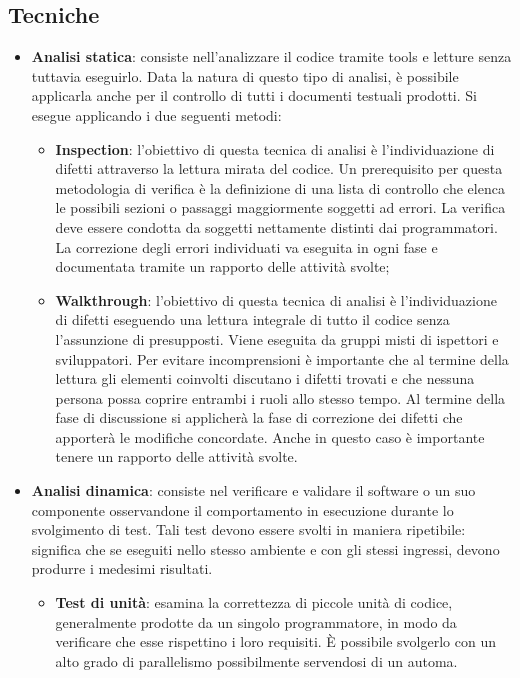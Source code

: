 \subsection {Tecniche}
\begin{itemize}
\item \textbf{Analisi statica}: consiste nell’analizzare il codice tramite tools e letture senza tuttavia eseguirlo. Data la natura di questo tipo di analisi, è possibile applicarla anche per il controllo di tutti i documenti testuali prodotti.
Si esegue applicando i due seguenti metodi:
\begin{itemize}
\item \textbf{Inspection}: l’obiettivo di questa tecnica di analisi è l’individuazione di difetti attraverso la lettura mirata del codice. Un prerequisito per questa metodologia di verifica è la definizione di una lista di controllo che elenca le possibili sezioni o passaggi maggiormente soggetti ad errori. La verifica deve essere condotta da soggetti nettamente distinti dai programmatori. La correzione degli errori individuati va eseguita in ogni fase e documentata tramite un rapporto delle attività svolte;

\item \textbf{Walkthrough}: l'obiettivo di questa tecnica di analisi è l'individuazione di difetti eseguendo una lettura integrale di tutto il codice senza l'assunzione di presupposti. Viene eseguita da gruppi misti di ispettori e sviluppatori.
Per evitare incomprensioni è importante che al termine della lettura gli elementi coinvolti discutano i difetti trovati e che nessuna persona possa coprire entrambi i ruoli allo stesso tempo.
Al termine della fase di discussione si applicherà la fase di correzione dei difetti che apporterà le modifiche concordate. 
Anche in questo caso è importante tenere un rapporto delle attività svolte.
\end{itemize}

\item \textbf{Analisi dinamica}: consiste nel verificare e validare il software o un suo componente osservandone il comportamento in esecuzione durante lo svolgimento di test. Tali test devono essere svolti in maniera ripetibile: significa che se eseguiti nello stesso ambiente e con gli stessi ingressi, devono produrre i medesimi risultati.
\begin{itemize}
\item \textbf{Test di unità}: esamina la correttezza di piccole unità di codice, generalmente prodotte da un singolo programmatore, in modo da verificare che esse rispettino i loro requisiti. È possibile svolgerlo con un alto grado di parallelismo possibilmente servendosi di un automa.


\end{itemize}
\end{itemize}

